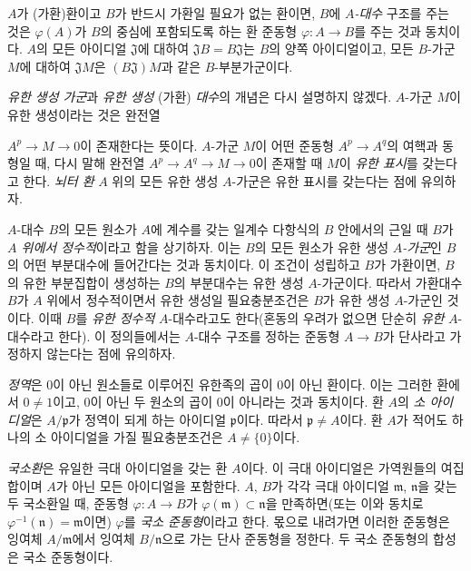 \begin{env}[1.0.4]
\label{0.1.0.4-ko}
$A$가 (가환)환이고 $B$가 반드시 가환일 필요가 없는 환이면, $B$에 \emph{$A$-대수} 구조를 주는 것은 $\varphi(A)$가 $B$의 중심에 포함되도록 하는 환 준동형 $\varphi:A\to B$를 주는 것과 동치이다.
$A$의 모든 아이디얼 $\mathfrak{J}$에 대하여 $\mathfrak{J}B=B\mathfrak{J}$는 $B$의 양쪽 아이디얼이고, 모든 $B$-가군 $M$에 대하여 $\mathfrak{J}M$은 $(B\mathfrak{J})M$과 같은 $B$-부분가군이다.
\end{env}

\begin{env}[1.0.5]
\label{0.1.0.5-ko}
\emph{유한 생성 가군}과 \emph{유한 생성} (가환) \emph{대수}의 개념은 다시 설명하지 않겠다. $A$-가군 $M$이 유한 생성이라는 것은 완전열

$A^p\to M\to 0$이 존재한다는 뜻이다.
$A$-가군 $M$이 어떤 준동형 $A^p\to A^q$의 여핵과 동형일 때, 다시 말해 완전열 $A^p\to A^q\to M\to 0$이 존재할 때 $M$이 \emph{유한 표시}를 갖는다고 한다.
\emph{뇌터 환} $A$ 위의 모든 유한 생성 $A$-가군은 유한 표시를 갖는다는 점에 유의하자.

$A$-대수 $B$의 모든 원소가 $A$에 계수를 갖는 일계수 다항식의 $B$ 안에서의 근일 때 $B$가 \emph{$A$ 위에서 정수적}이라고 함을 상기하자. 이는 $B$의 모든 원소가 유한 생성 \emph{$A$-가군}인 $B$의 어떤 부분대수에 들어간다는 것과 동치이다.
이 조건이 성립하고 $B$가 가환이면, $B$의 유한 부분집합이 생성하는 $B$의 부분대수는 유한 생성 $A$-가군이다. 따라서 가환대수 $B$가 $A$ 위에서 정수적이면서 유한 생성일 필요충분조건은 $B$가 유한 생성 $A$-가군인 것이다. 이때 $B$를 \emph{유한 정수적} $A$-대수라고도 한다(혼동의 우려가 없으면 단순히 \emph{유한} $A$-대수라고 한다).
이 정의들에서는 $A$-대수 구조를 정하는 준동형 $A\to B$가 단사라고 가정하지 않는다는 점에 유의하자.
\end{env}

\begin{env}[1.0.6]
\label{0.1.0.6-ko}
\emph{정역}은 $0$이 아닌 원소들로 이루어진 유한족의 곱이 $0$이 아닌 환이다. 이는 그러한 환에서 $0\neq 1$이고, $0$이 아닌 두 원소의 곱이 $0$이 아니라는 것과 동치이다.
환 $A$의 \emph{소 아이디얼}은 $A/\mathfrak{p}$가 정역이 되게 하는 아이디얼 $\mathfrak{p}$이다. 따라서 $\mathfrak{p}\neq A$이다.
환 $A$가 적어도 하나의 소 아이디얼을 가질 필요충분조건은 $A\neq\{0\}$이다.
\end{env}

\begin{env}[1.0.7]
\label{0.1.0.7-ko}
\emph{국소환}은 유일한 극대 아이디얼을 갖는 환 $A$이다. 이 극대 아이디얼은 가역원들의 여집합이며 $A$가 아닌 모든 아이디얼을 포함한다.
$A$, $B$가 각각 극대 아이디얼 $\mathfrak{m}$, $\mathfrak{n}$을 갖는 두 국소환일 때, 준동형 $\varphi:A\to B$가 $\varphi(\mathfrak{m})\subset\mathfrak{n}$을 만족하면(또는 이와 동치로 $\varphi^{-1}(\mathfrak{n})=\mathfrak{m}$이면) $\varphi$를 \emph{국소 준동형}이라고 한다.
몫으로 내려가면 이러한 준동형은 잉여체 $A/\mathfrak{m}$에서 잉여체 $B/\mathfrak{n}$으로 가는 단사 준동형을 정한다.
두 국소 준동형의 합성은 국소 준동형이다.
\end{env}

